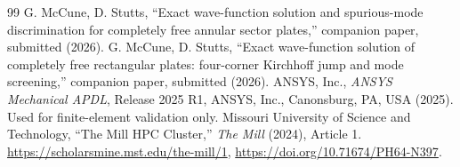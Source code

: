 \documentclass[11pt]{article}
\begin{document}
\begin{thebibliography}{99}
 G. McCune, D. Stutts, ``Exact wave-function
solution and spurious-mode discrimination for completely free annular sector
plates,'' companion paper, submitted (2026).
 G. McCune, D. Stutts, ``Exact wave-function solution
of completely free rectangular plates: four-corner Kirchhoff jump and mode
screening,'' companion paper, submitted (2026).
 ANSYS, Inc., \emph{ANSYS Mechanical APDL}, Release 2025 R1,
ANSYS, Inc., Canonsburg, PA, USA (2025). Used for finite-element validation
only.
 Missouri University of Science and Technology, ``The Mill
HPC Cluster,'' \emph{The Mill} (2024), Article 1.
\url{https://scholarsmine.mst.edu/the-mill/1},
\url{https://doi.org/10.71674/PH64-N397}.
\end{thebibliography}
\end{document}
